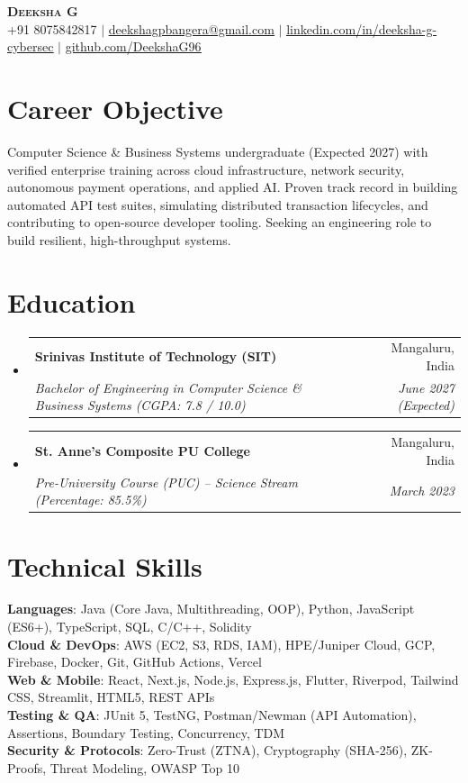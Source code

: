 \documentclass[letterpaper,10pt]{article}
\makeatletter
\newcommand{\resumeSubheading}[4]{
  \vspace{1pt}\item
    \begin{tabular*}{0.98\textwidth}[t]{l@{\extracolsep{\fill}}r}
      \textbf{#1} & #2 \\
      \textit{\small#3} & \textit{\small #4} \\
    \end{tabular*}\vspace{-2pt}
}
\newcommand{\resumeSubHeadingListStart}{\begin{itemize}[leftmargin=0.15in, label={}, itemsep=0pt, parsep=0pt, topsep=1pt]}
\newcommand{\resumeSubHeadingListEnd}{\end{itemize}\vspace{-3pt}}
\makeatother
\begin{document}
\begin{center}
    \textbf{\Huge \scshape Deeksha G} \\ \vspace{2pt}
    \small +91 8075842817 $|$ \href{mailto:deekshagpbangera@gmail.com}{\underline{deekshagpbangera@gmail.com}} $|$ 
    \href{https://linkedin.com/in/deeksha-g-cybersec}{\underline{linkedin.com/in/deeksha-g-cybersec}} $|$
    \href{https://github.com/DeekshaG96}{\underline{github.com/DeekshaG96}}
\end{center}
\vspace{-13pt}

\section{Career Objective}
\small{Computer Science \& Business Systems undergraduate (Expected 2027) with verified enterprise training across cloud infrastructure, network security, autonomous payment operations, and applied AI. Proven track record in building automated API test suites, simulating distributed transaction lifecycles, and contributing to open-source developer tooling. Seeking an engineering role to build resilient, high-throughput systems.}

\section{Education}
  \resumeSubHeadingListStart
    \resumeSubheading
      {Srinivas Institute of Technology (SIT)}{Mangaluru, India}
      {Bachelor of Engineering in Computer Science \& Business Systems (CGPA: 7.8 / 10.0)}{June 2027 (Expected)}
    \resumeSubheading
      {St. Anne's Composite PU College}{Mangaluru, India}
      {Pre-University Course (PUC) -- Science Stream (Percentage: 85.5\%)}{March 2023}
  \resumeSubHeadingListEnd

\section{Technical Skills}
 \begin{itemize}[leftmargin=0.15in, label={}, itemsep=0.5pt, parsep=0pt, topsep=1pt]
    \small{\item{
     \textbf{Languages}{: Java (Core Java, Multithreading, OOP), Python, JavaScript (ES6+), TypeScript, SQL, C/C++, Solidity} \\
     \textbf{Cloud \& DevOps}{: AWS (EC2, S3, RDS, IAM), HPE/Juniper Cloud, GCP, Firebase, Docker, Git, GitHub Actions, Vercel} \\
     \textbf{Web \& Mobile}{: React, Next.js, Node.js, Express.js, Flutter, Riverpod, Tailwind CSS, Streamlit, HTML5, REST APIs} \\
     \textbf{Testing \& QA}{: JUnit 5, TestNG, Postman/Newman (API Automation), Assertions, Boundary Testing, Concurrency, TDM} \\
     \textbf{Security \& Protocols}{: Zero-Trust (ZTNA), Cryptography (SHA-256), ZK-Proofs, Threat Modeling, OWASP Top 10}
    }}
 \end{itemize}
\end{document}
